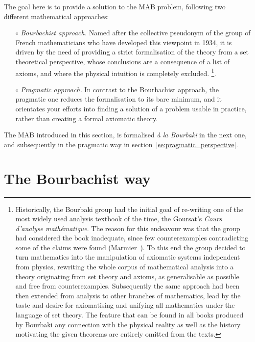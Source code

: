 \documentclass[]{scrartcl}
\theoremstyle{definition}
\begin{document}
The goal here is to provide a solution to the MAB problem, following two different mathematical approaches:
\begin{itemize}
    \item[$\circ$] \emph{Bourbachist approach.} Named after the collective pseudonym of the group of French mathematicians who have developed this viewpoint in 1934, it is driven by the need of providing a strict formalisation of the theory from a set theoretical perspective, whose conclusions are a consequence of a list of   axioms, and where the physical intuition is completely excluded. \footnote{
        Historically, the Bourbaki group had the initial goal of re-writing one of the most widely used analysis textbook of the time, the Goursat’s \emph{Cours d'analyse mathématique}. The reason for this endeavour was that the group had considered the book inadequate, since few counterexamples contradicting some of the claims were found (Marmier~\cite{marmier2014idea}). To this end the group decided to turn mathematics into the manipulation of axiomatic systems independent from physics, rewriting the whole corpus of mathematical analysis into a theory originating from set theory and axioms, as generalisable as possible and free from counterexamples. Subsequently the same approach had been then extended from analysis to other branches of mathematics, lead by the taste and desire for axiomatising and unifying all mathematics under the language of set theory. The feature that can be found in all books produced by Bourbaki any connection with the physical reality as well as the history motivating the given theorems are entirely omitted from the texts.
    }. 
    \item[$\circ$] \emph{Pragmatic approach.} In contrast to the Bourbachist approach, the pragmatic one reduces the formalisation to its bare minimum, and it orientates your efforts into finding a solution of a problem usable in practice, rather than creating a formal axiomatic theory.
\end{itemize}
The MAB introduced in this section, is formalised \emph{à la Bourbaki} in the next one, and subsequently in the pragmatic way in section~\ref{se:pragmatic_perspective}.


\section{The Bourbachist way}
\label{se:bourbaki_perspective}
\end{document}
